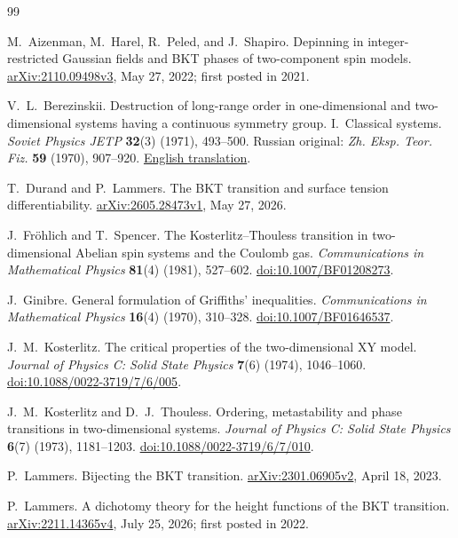 \begin{thebibliography}{99}
\raggedright

M.~Aizenman, M.~Harel, R.~Peled, and J.~Shapiro.
Depinning in integer-restricted Gaussian fields and BKT phases of
 two-component spin models.
\href{https://arxiv.org/abs/2110.09498v3}{arXiv:2110.09498v3},
May 27, 2022; first posted in 2021.

V.~L.~Berezinskii.
Destruction of long-range order in one-dimensional and
two-dimensional systems having a continuous symmetry group.
I.~Classical systems.
\emph{Soviet Physics JETP} \textbf{32}(3) (1971), 493--500.
Russian original: \emph{Zh. Eksp. Teor. Fiz.} \textbf{59}
(1970), 907--920.
\href{https://www.jetp.ras.ru/cgi-bin/dn/e_032_03_0493.pdf}
{English translation}.

T.~Durand and P.~Lammers.
The BKT transition and surface tension differentiability.
\href{https://arxiv.org/abs/2605.28473v1}{arXiv:2605.28473v1},
May 27, 2026.

J.~Fr\"ohlich and T.~Spencer.
The Kosterlitz--Thouless transition in two-dimensional Abelian
spin systems and the Coulomb gas.
\emph{Communications in Mathematical Physics}
\textbf{81}(4) (1981), 527--602.
\href{https://doi.org/10.1007/BF01208273}
{doi:10.1007/BF01208273}.

J.~Ginibre.
General formulation of Griffiths' inequalities.
\emph{Communications in Mathematical Physics} \textbf{16}(4)
(1970), 310--328.
\href{https://doi.org/10.1007/BF01646537}{doi:10.1007/BF01646537}.

J.~M.~Kosterlitz.
The critical properties of the two-dimensional XY model.
\emph{Journal of Physics C: Solid State Physics}
\textbf{7}(6) (1974), 1046--1060.
\href{https://doi.org/10.1088/0022-3719/7/6/005}
{doi:10.1088/0022-3719/7/6/005}.

J.~M.~Kosterlitz and D.~J.~Thouless.
Ordering, metastability and phase transitions in two-dimensional systems.
\emph{Journal of Physics C: Solid State Physics}
\textbf{6}(7) (1973), 1181--1203.
\href{https://doi.org/10.1088/0022-3719/6/7/010}
{doi:10.1088/0022-3719/6/7/010}.

P.~Lammers.
Bijecting the BKT transition.
\href{https://arxiv.org/abs/2301.06905v2}{arXiv:2301.06905v2},
April 18, 2023.

P.~Lammers.
A dichotomy theory for the height functions of the BKT transition.
\href{https://arxiv.org/abs/2211.14365v4}{arXiv:2211.14365v4},
July 25, 2026; first posted in 2022.


\end{thebibliography}
